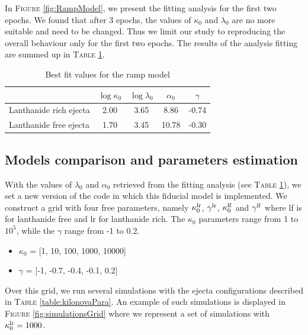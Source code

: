\documentclass[a4paper, twoside, 11pt]{article}
\numberwithin{equation}{section}
\begin{document}
In F\textsc{igure} \ref{fig:RampModel}, we present the fitting analysis for the first two epochs. We found that after 3 epochs, the values of $\kappa_0$ and $\lambda_0$ are no more suitable and need to be changed.  Thus we limit our study to reproducing the overall behaviour only for the first two epochs. The results of the analysis fitting are summed up in T\textsc{able} \ref{table:RampModel}.

\begin{table}[!h]
\centering
\begin{tabular}{l||c|c|c|c}
				& $\log\kappa_0$ & $\log\lambda_0$ & $\alpha_0$ & $\gamma$\\
				\hline
Lanthanide rich ejecta & 2.00 & 3.65	& 8.86	& -0.74\\
\hline
Lanthanide free ejecta 	& 	1.70 & 3.45	& 10.78& -0.30
\end{tabular}
\caption{Best fit values for the ramp model}
\label{table:RampModel}
\end{table}


\subsection{Models comparison and parameters estimation }
\label{subsec:bestFit}

\hspace{\parindent} With the values of $\lambda_0$ and $\alpha_0$ retrieved from the fitting analysis (see T\textsc{able} \ref{table:RampModel}), we set a new version of the code in which this fiducial model is implemented. We construct a grid with four free parameters, namely $\kappa_0^{\rm{lr}}$, $\gamma^{\rm{lr}}$, $\kappa_0^{\rm{lf}}$ and $\gamma^{\rm{lf}}$ where lf is for lanthanide free and lr for lanthanide rich. The $\kappa_0$ parameters range from 1 to $10^5$, while the $\gamma$ range from -1 to 0.2. 
\begin{itemize}
\item $\kappa_0$ = [1, 10, 100, 1000, 10000]
\item $\gamma$ = [-1, -0.7, -0.4, -0.1, 0.2]
\end{itemize}
Over this grid, we run several simulations with the ejecta configurations described in T\textsc{able} \ref{table:kilonovaPara}. An example of such simulations is displayed in F\textsc{igure} \ref{fig:simulationsGrid} where we represent a set of simulations with $\kappa_0^{\rm{lr}} = 1000$. 
\end{document}
